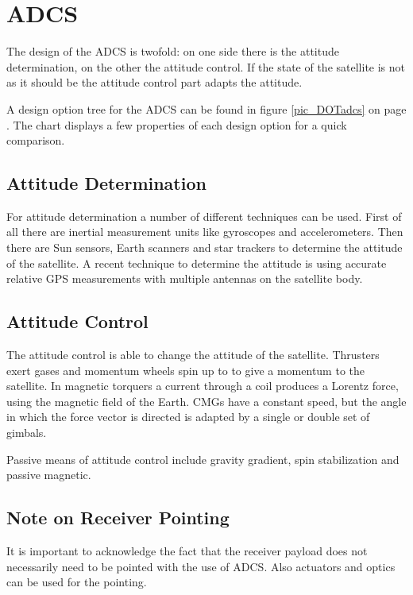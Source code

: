 \section{\acl{ADCS}}
\label{designOptionsADCS}
The design of the \ac{ADCS} is twofold: on one side there is the attitude determination, on the other the attitude control. If the state of the satellite is not as it should be the attitude control part adapts the attitude.

A design option tree for the \ac{ADCS} can be found in figure \ref{pic_DOTadcs} on page \pageref{pic_DOTadcs}. The chart displays a few properties of each design option for a quick comparison.

\subsection{Attitude Determination}
For attitude determination a number of different techniques can be used. First of all there are inertial measurement units like gyroscopes and accelerometers.  Then there are Sun sensors, Earth scanners and star trackers to determine the attitude of the satellite. A recent technique to determine the attitude is using accurate relative \ac{GPS} measurements with multiple antennas on the satellite body.

\subsection{Attitude Control}
The attitude control is able to change the attitude of the satellite. Thrusters exert gases and momentum wheels spin up to to give a momentum to the satellite. In magnetic torquers a current through a coil produces a Lorentz force, using the magnetic field of the Earth. \ac{CMG}s have a constant speed, but the angle in which the force vector is directed is adapted by a single or double set of gimbals. 

Passive means of attitude control include gravity gradient, spin stabilization and passive magnetic. 

\subsection{Note on Receiver Pointing}
It is important to acknowledge the fact that the receiver payload does not necessarily need to be pointed with the use of \ac{ADCS}. Also actuators and optics can be used for the pointing.

